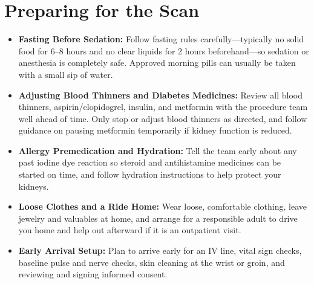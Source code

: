 \section{Preparing for the Scan}
\begin{itemize}
\item \textbf{Fasting Before Sedation:} Follow fasting rules carefully---typically no solid food for 6--8 hours and no clear liquids for 2 hours beforehand---so sedation or anesthesia is completely safe. Approved morning pills can usually be taken with a small sip of water.
\item \textbf{Adjusting Blood Thinners and Diabetes Medicines:} Review all blood thinners, aspirin/clopidogrel, insulin, and metformin with the procedure team well ahead of time. Only stop or adjust blood thinners as directed, and follow guidance on pausing metformin temporarily if kidney function is reduced.
\item \textbf{Allergy Premedication and Hydration:} Tell the team early about any past iodine dye reaction so steroid and antihistamine medicines can be started on time, and follow hydration instructions to help protect your kidneys.
\item \textbf{Loose Clothes and a Ride Home:} Wear loose, comfortable clothing, leave jewelry and valuables at home, and arrange for a responsible adult to drive you home and help out afterward if it is an outpatient visit.
\item \textbf{Early Arrival Setup:} Plan to arrive early for an IV line, vital sign checks, baseline pulse and nerve checks, skin cleaning at the wrist or groin, and reviewing and signing informed consent.
\end{itemize}

